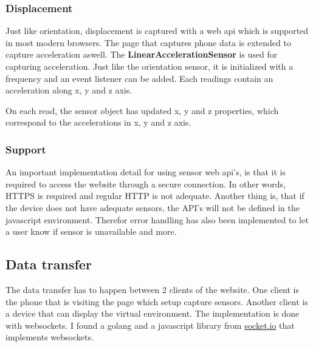 \subsubsection{Displacement}
Just like orientation, displacement is captured with a web api which is supported in most modern browsers. 
The page that captures phone data is extended to capture acceleration aswell. 
The \textbf{LinearAccelerationSensor} is used for capturing acceleration.
Just like the orientation sensor, it is initialized with a frequency and an event listener can be added.
Each readings contain an acceleration along x, y and z axis.


On each read, the sensor object has updated x, y and z properties, which correspond to the accelerations in x, y and z axis.

\subsubsection{Support}
An important implementation detail for using sensor web api's, is that it is required to access the website through a secure connection.
In other words, HTTPS is required and regular HTTP is not adequate.
Another thing is, that if the device does not have adequate sensors, the API's will not be defined in the javascript environment.
Therefor error handling has also been implemented to let a user know if sensor is unavailable and more. 

\subsection{Data transfer}
The data transfer has to happen between 2 clients of the website.
One client is the phone that is visiting the page which setup capture sensors.
Another client is a device that can display the virtual environment.
The implementation is done with websockets. I found a golang and a javascript library from \href{https://socket.io/}{socket.io} that implements websockets.

